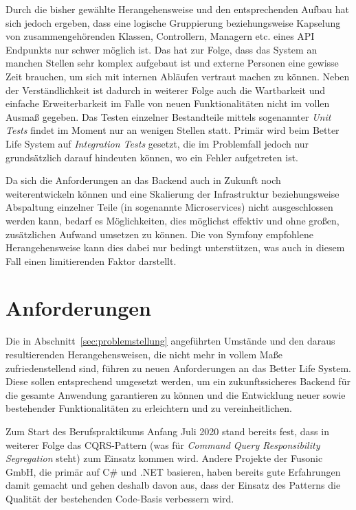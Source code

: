 \documentclass[a4paper,12pt,twoside]{scrreprt}
\begin{document}
Durch die bisher gewählte Herangehensweise und den entsprechenden Aufbau hat sich jedoch ergeben, dass eine logische Gruppierung beziehungsweise Kapselung von zusammengehörenden Klassen, Controllern, Managern etc. eines API Endpunkts nur schwer möglich ist. Das hat zur Folge, dass das System an manchen Stellen sehr komplex aufgebaut ist und externe Personen eine gewisse Zeit brauchen, um sich mit internen Abläufen vertraut machen zu können. Neben der Verständlichkeit ist dadurch in weiterer Folge auch die Wartbarkeit und einfache Erweiterbarkeit im Falle von neuen Funktionalitäten nicht im vollen Ausmaß gegeben. Das Testen einzelner Bestandteile mittels sogenannter \textit{Unit Tests} findet im Moment nur an wenigen Stellen statt. Primär wird beim Better Life System auf \textit{Integration Tests} gesetzt, die im Problemfall jedoch nur grundsätzlich darauf hindeuten können, wo ein Fehler aufgetreten ist.

Da sich die Anforderungen an das Backend auch in Zukunft noch weiterentwickeln können und eine Skalierung der Infrastruktur beziehungsweise Abspaltung einzelner Teile (in sogenannte Microservices) nicht ausgeschlossen werden kann, bedarf es Möglichkeiten, dies möglichst effektiv und ohne großen, zusätzlichen Aufwand umsetzen zu können. Die von Symfony empfohlene Herangehensweise kann dies dabei nur bedingt unterstützen, was auch in diesem Fall einen limitierenden Faktor darstellt.

\section{Anforderungen}
\label{sec:anforderungen}
Die in Abschnitt~\ref{sec:problemstellung} angeführten Umstände und den daraus resultierenden Herangehensweisen, die nicht mehr in vollem Maße zufriedenstellend sind, führen zu neuen Anforderungen an das Better Life System. Diese sollen entsprechend umgesetzt werden, um ein zukunftssicheres Backend für die gesamte Anwendung garantieren zu können und die Entwicklung neuer sowie bestehender Funktionalitäten zu erleichtern und zu vereinheitlichen.

\medskip

Zum Start des Berufspraktikums Anfang Juli 2020 stand bereits fest, dass in weiterer Folge das CQRS-Pattern (was für \textit{Command Query Responsibility Segregation} steht) zum Einsatz kommen wird. Andere Projekte der Fusonic GmbH, die primär auf C\# und .NET basieren, haben bereits gute Erfahrungen damit gemacht und gehen deshalb davon aus, dass der Einsatz des Patterns die Qualität der bestehenden Code-Basis verbessern wird.
\end{document}
